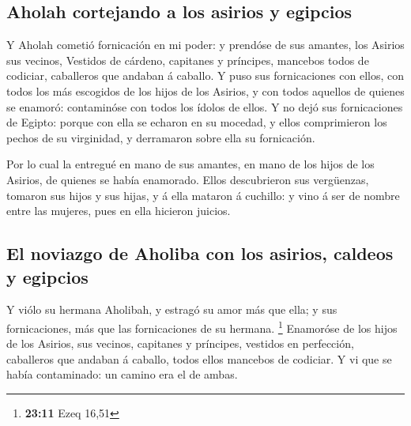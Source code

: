 \hypertarget{aholah-cortejando-a-los-asirios-y-egipcios}{%
\subsection{Aholah cortejando a los asirios y
egipcios}\label{aholah-cortejando-a-los-asirios-y-egipcios}}

 Y Aholah cometió fornicación en mi poder: y prendóse de
sus amantes, los Asirios sus vecinos,  Vestidos de
cárdeno, capitanes y príncipes, mancebos todos de codiciar, caballeros
que andaban á caballo.  Y puso sus fornicaciones con
ellos, con todos los más escogidos de los hijos de los Asirios, y con
todos aquellos de quienes se enamoró: contaminóse con todos los ídolos
de ellos.  Y no dejó sus fornicaciones de Egipto: porque
con ella se echaron en su mocedad, y ellos comprimieron los pechos de su
virginidad, y derramaron sobre ella su fornicación.

 Por lo cual la entregué en mano de sus amantes, en mano
de los hijos de los Asirios, de quienes se había enamorado.
 Ellos descubrieron sus vergüenzas, tomaron sus hijos y
sus hijas, y á ella mataron á cuchillo: y vino á ser de nombre entre las
mujeres, pues en ella hicieron juicios.

\hypertarget{el-noviazgo-de-aholiba-con-los-asirios-caldeos-y-egipcios}{%
\subsection{El noviazgo de Aholiba con los asirios, caldeos y
egipcios}\label{el-noviazgo-de-aholiba-con-los-asirios-caldeos-y-egipcios}}

 Y viólo su hermana Aholibah, y estragó su amor más que
ella; y sus fornicaciones, más que las fornicaciones de su hermana.
\footnote{\textbf{23:11} Ezeq 16,51}  Enamoróse de los
hijos de los Asirios, sus vecinos, capitanes y príncipes, vestidos en
perfección, caballeros que andaban á caballo, todos ellos mancebos de
codiciar.  Y vi que se había contaminado: un camino era
el de ambas.

